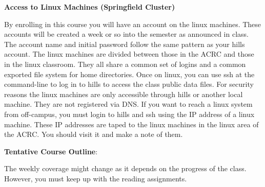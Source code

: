 \documentclass[11pt]{article}
\begin{document}
\hspace{3mm}

\textbf{Access to Linux Machines (Springfield Cluster)}

\hspace{3mm}

By enrolling in this course you will have an account on the linux machines.
These accounts will be created a week or so into the semester as announced in
class. The account name and initial password follow the same pattern as your
hills account. The linux machines are divided between those in the ACRC and
those in the linux classroom. They all share a common set of logins and a
common exported file system for home directories. Once on linux, you can use
ssh at the command-line to log in to hills to access the class public data
files.  For security reasons the linux machines are only accessible through
hills or another local machine. They are not registered via DNS. If you want to
reach a linux system from off-campus, you must login to hills and ssh using the
IP address of a linux machine. These IP addresses are taped to the linux
machines in the linux area of the ACRC. You should visit it and make a note of
them.


\hspace{3mm}

\textbf {\large Tentative Course Outline}:

The weekly coverage might change as it depends on the progress of the class.
However, you must keep up with the reading assignments.
\end{document}
